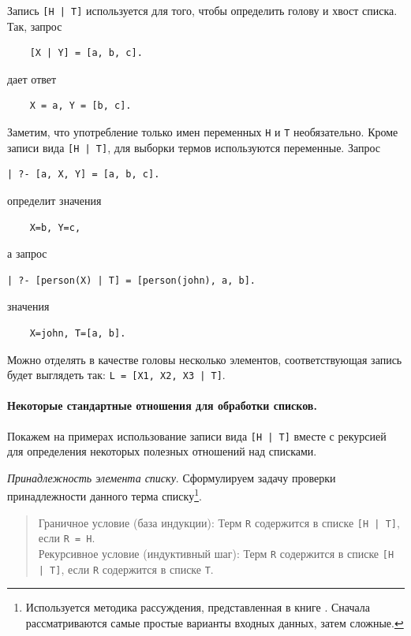 \documentclass[12pt, openany, twoside]{book} %
\begin{document}
Запись {\tt [Н | Т]} используется для того, чтобы определить голову и хвост списка. Так, запрос
{\tt\begin{verbatim}
    [X | Y] = [a, b, c].
\end{verbatim}}
\noindent дает ответ
{\tt\begin{verbatim}
    Х = а, Y = [b, c].
\end{verbatim}}

Заметим, что употребление только имен переменных {\tt Н} и {\tt Т} необязательно. Кроме записи вида {\tt [H | T]}, для выборки термов используются переменные. Запрос
{\tt\begin{verbatim}
| ?- [a, X, Y] = [a, b, c].
\end{verbatim}}
\noindent определит значения
{\tt\begin{verbatim}
    X=b, Y=c,
\end{verbatim}}
\noindent а запрос
{\tt\begin{verbatim}
| ?- [person(Х) | Т] = [person(john), а, b].
\end{verbatim}}
\noindent значения
{\tt\begin{verbatim}
    Х=john, Т=[а, b].
\end{verbatim}}

Можно отделять в качестве головы несколько элементов, соответствующая запись будет выглядеть так: {\tt L = [X1, X2, X3 | T]}.

\paragraph{Некоторые стандартные отношения для обработки списков.} Покажем на примерах использование записи вида {\tt [Н | T]} вместе с рекурсией для определения некоторых полезных отношений над списками.

\emph{Принадлежность элемента списку}. Сформулируем задачу проверки принадлежности данного терма списку\footnote{Используется методика рассуждения, представленная в книге \cite{Bratko}. Сначала рассматриваются самые простые варианты входных данных, затем сложные.}.

\begin{quote}
\noindent Граничное условие (база индукции): Терм {\tt R} содержится в списке {\tt [H | T]}, если {\tt R = H}.\\
Рекурсивное условие (индуктивный шаг): Терм {\tt R} содержится в списке {\tt [H | T]}, если {\tt R}
содержится в списке {\tt Т}.
\end{quote}
\end{document}
